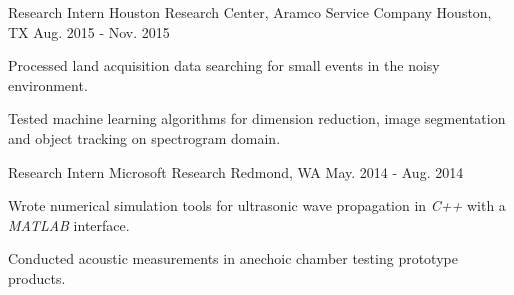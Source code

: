 \begin{cventries}
  \cventry
    {Research Intern} %
    {Houston Research Center, Aramco Service Company} %
    {Houston, TX} %
    {Aug. 2015 - Nov. 2015} %
    {
      \begin{cvitems} %
        \item {Processed land acquisition data searching for small events in the noisy environment.}
        \item {Tested machine learning algorithms for dimension reduction, image segmentation and object tracking on spectrogram domain.}
      \end{cvitems}
    }

  \cventry
    {Research Intern} %
    {Microsoft Research} %
    {Redmond, WA} %
    {May. 2014 - Aug. 2014} %
    {
      \begin{cvitems} %
        \item {Wrote numerical simulation tools for ultrasonic wave propagation in \textit{C++} with a \textit{MATLAB} interface.}
        \item {Conducted acoustic measurements in anechoic chamber testing prototype products.}
      \end{cvitems}
    }


\end{cventries}
